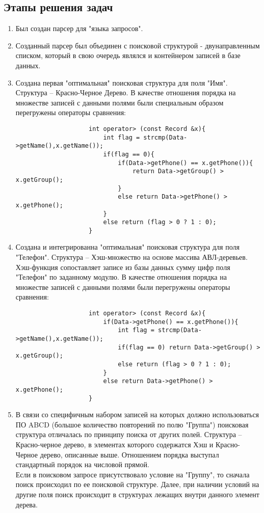\documentclass[a4paper, 14pt]{extreport}
\begin{document}
	 \subsection{Этапы решения задач}
	 	\begin{enumerate}
				\item Был создан парсер для "языка запросов".
				\item Созданный парсер был объединен с поисковой структурой - двунаправленным списком, который в свою очередь являлся и контейнером записей в базе данных.
				\item Создана первая "оптимальная" поисковая структура для поля "Имя". Структура -- Красно-Черное Дерево. В качестве отношения порядка на множестве записей с данными полями были специальным образом перегружены операторы сравнения:
					\begin{verbatim}
					int operator> (const Record &x){
					    int flag = strcmp(Data->getName(),x.getName());
					    if(flag == 0){
					        if(Data->getPhone() == x.getPhone()){
					            return Data->getGroup() > x.getGroup();
					        }
					        else return Data->getPhone() > x.getPhone();
					    }
					    else return (flag > 0 ? 1 : 0);
					}
					\end{verbatim}
				\item Создана и интегрированна "оптимальная" поисковая структура для поля "Телефон". Структура -- Хэш-множество на основе массива АВЛ-деревьев. Хэш-функция сопоставляет записе из базы данных сумму цифр поля "Телефон" по заданному модулю. В качестве отношения порядка на множестве записей с данными полями были перегружены операторы сравнения:
					\begin{verbatim}
					int operator> (const Record &x){
					    if(Data->getPhone() == x.getPhone()){
					        int flag = strcmp(Data->getName(),x.getName());
					        if(flag == 0) return Data->getGroup() > x.getGroup();
					        else return (flag > 0 ? 1 : 0);
					    }
					    else return Data->getPhone() > x.getPhone();
					}
					\end{verbatim}
				\item В связи со специфичным набором записей на которых должно использоваться ПО ABCD (большое количество повторений по полю "Группа") поисковая структура отличалась по принципу поиска от других полей. Структура -- Красно-черное дерево, в элементах которого содержатся Хэш и Красно-Черное дерево, описанные выше. Отношением порядка выступал стандартный порядок на числовой прямой. 
				\\	Если в поисковом запросе присутствовало условие на "Группу", то сначала поиск происходил по ее поисковой структуре. Далее, при наличии условий на другие поля поиск происходит в структурах лежащих внутри данного элемент дерева.

\end{enumerate}
\end{document}
